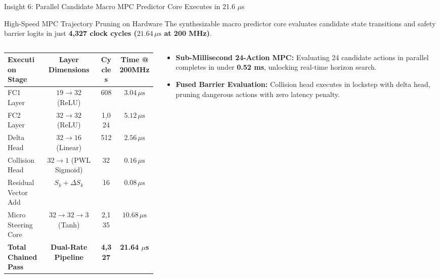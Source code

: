 \documentclass[aspectratio=169, 10pt]{beamer}
\begin{document}
\begin{frame}{Insight 6: Parallel Candidate Macro MPC Predictor Core Executes in 21.6 $\mu$s}
  \begin{block}{High-Speed MPC Trajectory Pruning on Hardware}
    The synthesizable macro predictor core evaluates candidate state transitions and safety barrier logits in just \textbf{4,327 clock cycles ($21.64\,\mu\text{s}$ at 200 MHz)}.
  \end{block}
  \vspace{-0.2cm}
  \begin{columns}[T]
    \begin{column}{0.52\textwidth}
      \setlength{\tabcolsep}{3pt}
      \begin{table}
        \centering
        \scriptsize
        \begin{tabular}{lccc}
          \toprule
          \textbf{Execution Stage} & \textbf{Layer Dimensions} & \textbf{Cycles} & \textbf{Time @ 200MHz} \\
          \midrule
          FC1 Layer & $19 \to 32$ (ReLU) & 608 & $3.04\,\mu\text{s}$ \\
          FC2 Layer & $32 \to 32$ (ReLU) & 1,024 & $5.12\,\mu\text{s}$ \\
          Delta Head & $32 \to 16$ (Linear) & 512 & $2.56\,\mu\text{s}$ \\
          Collision Head & $32 \to 1$ (PWL Sigmoid) & 32 & $0.16\,\mu\text{s}$ \\
          Residual Vector Add & $S_k + \Delta S_k$ & 16 & $0.08\,\mu\text{s}$ \\
          Micro Steering Core & $32 \to 32 \to 3$ (Tanh) & 2,135 & $10.68\,\mu\text{s}$ \\
          \midrule
          \textbf{Total Chained Pass} & \textbf{Dual-Rate Pipeline} & \textbf{4,327} & \textbf{21.64 $\mu$s} \\
          \bottomrule
        \end{tabular}
      \end{table}
    \end{column}
    \begin{column}{0.46\textwidth}
      \begin{itemize}
        \item \textbf{Sub-Millisecond 24-Action MPC:} Evaluating 24 candidate actions in parallel completes in under \textbf{0.52 ms}, unlocking real-time horizon search.
        \item \textbf{Fused Barrier Evaluation:} Collision head executes in lockstep with delta head, pruning dangerous actions with zero latency penalty.
      \end{itemize}
    \end{column}
  \end{columns}
\end{frame}
\end{document}

